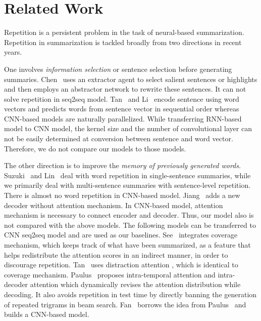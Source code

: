 \section{Related Work}
\label{sec:related}

Repetition is a persistent problem in the task of 
neural-based summarization. 
Repetition in summarization is tackled broadly from two directions in recent years. 

One involves {\em information selection} or sentence
selection before generating summaries.
Chen~\cite{P18-1063} uses an extractor agent 
to select salient sentences or highlights and then employs 
an abstractor network to rewrite these sentences.
It can not solve repetition in seq2seq model.
Tan~\cite{TanWX17} and Li~\cite{D18-1205,D18-1441} encode
sentence using word vectors
and predicts words from sentence vector in sequential order 
whereas CNN-based models are naturally parallelized. 
While transferring RNN-based model to CNN model, the kernel size and the number of 
convolutional layer can not be easily determined at conversion between sentence and word vector. 
Therefore, we do not compare our models to those models. 

The other direction is to improve the 
{\em memory of previously generated words}.
Suzuki~\cite{SuzukiN17} and Lin~\cite{LinSMS18} 
deal with word repetition in single-sentence summaries, 
while we primarily deal with multi-sentence summaries with 
sentence-level repetition. 
There is almost no word repetition in CNN-based model.
Jiang~\cite{JiangB18} adds a new decoder without attention mechanism.
In CNN-based model, attention mechanism is necessary to connect encoder 
and decoder.
Thus, our model also is not compared with the above models. 
The following models can be transferred to CNN seq2seq model and
are used as our baselines.
See~\cite{SeeLM17} integrates coverage mechanism, 
which keeps track of what have been summarized, as a feature that helps 
redistribute the attention scores in an indirect manner,
in order to discourage repetition. 
Tan~\cite{TanWX17} uses distraction attention
\cite{ChenZLWJ16}, which is identical to coverage mechanism. 
Paulus~\cite{PaulusXS17} proposes intra-temporal attention and 
intra-decoder attention which dynamically revises the attention distribution while decoding. 
It also avoids repetition in test time by directly banning the generation of 
repeated trigrams in beam search. 
Fan~\cite{FanGA18} borrows the idea from Paulus~\cite{PaulusXS17} and builds a CNN-based model. 

